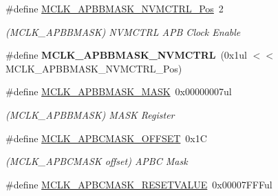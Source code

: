 \begin{DoxyCompactItemize}
\item 
\hypertarget{group___s_a_m_l21___m_c_l_k_ga00e3c7c7c317a8a1a2e828ed35e38993}{}\#define \hyperlink{group___s_a_m_l21___m_c_l_k_ga00e3c7c7c317a8a1a2e828ed35e38993}{M\+C\+L\+K\+\_\+\+A\+P\+B\+B\+M\+A\+S\+K\+\_\+\+N\+V\+M\+C\+T\+R\+L\+\_\+\+Pos}~2\label{group___s_a_m_l21___m_c_l_k_ga00e3c7c7c317a8a1a2e828ed35e38993}

\begin{DoxyCompactList}\small\item\em (M\+C\+L\+K\+\_\+\+A\+P\+B\+B\+M\+A\+S\+K) N\+V\+M\+C\+T\+R\+L A\+P\+B Clock Enable \end{DoxyCompactList}\item 
\hypertarget{group___s_a_m_l21___m_c_l_k_ga859d088ecae69a31dab834572749a8c3}{}\#define {\bfseries M\+C\+L\+K\+\_\+\+A\+P\+B\+B\+M\+A\+S\+K\+\_\+\+N\+V\+M\+C\+T\+R\+L}~(0x1ul $<$$<$ M\+C\+L\+K\+\_\+\+A\+P\+B\+B\+M\+A\+S\+K\+\_\+\+N\+V\+M\+C\+T\+R\+L\+\_\+\+Pos)\label{group___s_a_m_l21___m_c_l_k_ga859d088ecae69a31dab834572749a8c3}

\item 
\hypertarget{group___s_a_m_l21___m_c_l_k_ga17175a488d06a4b52abab2d654660456}{}\#define \hyperlink{group___s_a_m_l21___m_c_l_k_ga17175a488d06a4b52abab2d654660456}{M\+C\+L\+K\+\_\+\+A\+P\+B\+B\+M\+A\+S\+K\+\_\+\+M\+A\+S\+K}~0x00000007ul\label{group___s_a_m_l21___m_c_l_k_ga17175a488d06a4b52abab2d654660456}

\begin{DoxyCompactList}\small\item\em (M\+C\+L\+K\+\_\+\+A\+P\+B\+B\+M\+A\+S\+K) M\+A\+S\+K Register \end{DoxyCompactList}\item 
\hypertarget{group___s_a_m_l21___m_c_l_k_ga9adc77e1bade5beba117c02998b80574}{}\#define \hyperlink{group___s_a_m_l21___m_c_l_k_ga9adc77e1bade5beba117c02998b80574}{M\+C\+L\+K\+\_\+\+A\+P\+B\+C\+M\+A\+S\+K\+\_\+\+O\+F\+F\+S\+E\+T}~0x1\+C\label{group___s_a_m_l21___m_c_l_k_ga9adc77e1bade5beba117c02998b80574}

\begin{DoxyCompactList}\small\item\em (M\+C\+L\+K\+\_\+\+A\+P\+B\+C\+M\+A\+S\+K offset) A\+P\+B\+C Mask \end{DoxyCompactList}\item 
\hypertarget{group___s_a_m_l21___m_c_l_k_gad844382addaec4552ab75518ff2d7e74}{}\#define \hyperlink{group___s_a_m_l21___m_c_l_k_gad844382addaec4552ab75518ff2d7e74}{M\+C\+L\+K\+\_\+\+A\+P\+B\+C\+M\+A\+S\+K\+\_\+\+R\+E\+S\+E\+T\+V\+A\+L\+U\+E}~0x00007\+F\+F\+Ful\label{group___s_a_m_l21___m_c_l_k_gad844382addaec4552ab75518ff2d7e74}


\end{DoxyCompactItemize}
